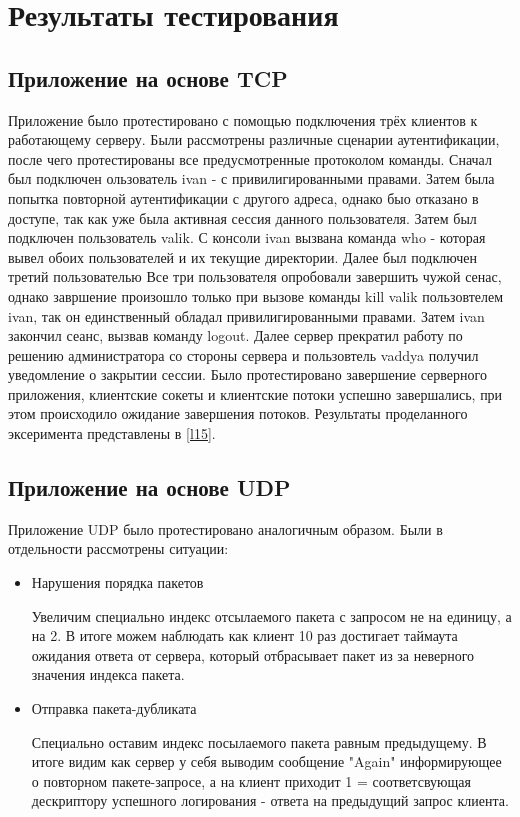 \section{Результаты тестирования}
\subsection{Приложение на основе TCP}

Приложение было протестировано с помощью подключения трёх клиентов к работающему серверу. Были рассмотрены различные сценарии аутентификации, после чего протестированы все предусмотренные протоколом команды. Сначал был подключен ользователь ivan - с привилигированными правами. Затем была попытка повторной аутентификации с другого адреса, однако быо отказано в доступе, так как уже была активная сессия данного пользователя. Затем был подключен пользователь valik. С консоли ivan вызвана команда who - которая вывел обоих пользователей и их текущие директории. Далее был подключен третий пользователью Все три пользователя опробовали завершить чужой сенас, однако завршение произошло только при вызове команды kill valik пользовтелем ivan, так он единственный обладал привилигированными правами. Затем ivan закончил сеанс, вызвав команду logout. Далее сервер прекратил работу по решению администратора со стороны сервера и пользовтель vaddya получил уведомление о закрытии сессии. Было протестировано завершение серверного приложения, клиентские сокеты и клиентские потоки успешно завершались, при этом происходило ожидание завершения потоков. Результаты проделанного эксеримента представлены в \ref{l15}. 



\subsection{Приложение на основе UDP}

Приложение UDP было протестировано аналогичным образом. Были в отдельности рассмотрены ситуации:
\begin{itemize}
\item Нарушения порядка пакетов



Увеличим специально индекс отсылаемого пакета с запросом не на единицу, а на 2. В итоге можем наблюдать как клиент 10 раз достигает таймаута ожидания ответа от сервера, который отбрасывает пакет из за неверного значения индекса пакета.

\item Отправка пакета-дубликата



Специально оставим индекс посылаемого пакета равным предыдущему. В итоге видим как сервер у себя выводим сообщение "Again" информирующее о повторном пакете-запросе, а на клиент приходит 1 = соответсвующая дескриптору успешного логирования - ответа на предыдущий запрос клиента.
\end{itemize}


